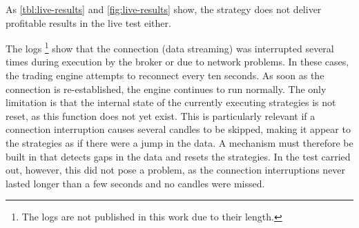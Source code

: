 \noindent
As \autoref{tbl:live-results} and \autoref{fig:live-results} show, the strategy does not deliver profitable results in the live test either.

The logs \footnote{The logs are not published in this work due to their length.} show that the connection (data streaming) was interrupted several times during execution by the broker or due to network problems.
In these cases, the trading engine attempts to reconnect every ten seconds.
As soon as the connection is re-established, the engine continues to run normally.
The only limitation is that the internal state of the currently executing strategies is not reset, as this function does not yet exist.
This is particularly relevant if a connection interruption causes several candles to be skipped, making it appear to the strategies as if there were a jump in the data.
A mechanism must therefore be built in that detects gaps in the data and resets the strategies.
In the test carried out, however, this did not pose a problem, as the connection interruptions never lasted longer than a few seconds and no candles were missed.
